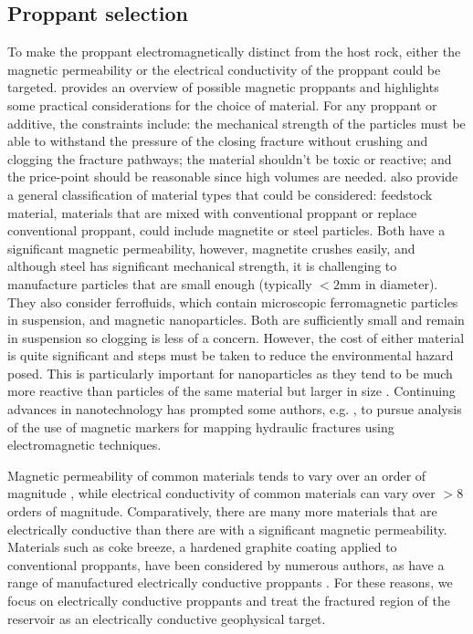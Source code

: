 \subsection{Proppant selection}
To make the proppant electromagnetically distinct from the host rock, either the magnetic permeability or the electrical conductivity of the proppant could be targeted. \cite{Zawadzki2016} provides an overview of possible magnetic proppants and highlights some practical considerations for the choice of material. For any proppant or additive, the constraints include: the mechanical strength of the particles must be able to withstand the pressure of the closing fracture without crushing and clogging the fracture pathways; the material shouldn’t be toxic or reactive; and the price-point should be reasonable since high volumes are needed. \cite{Zawadzki2016} also provide a general classification of material types that could be considered: feedstock material, materials that are mixed with conventional proppant or replace conventional proppant, could include magnetite or steel particles. Both have a significant magnetic permeability, however, magnetite crushes easily, and although steel has significant mechanical strength, it is challenging to manufacture particles that are small enough (typically $< 2$mm in diameter). They also consider ferrofluids, which contain microscopic ferromagnetic particles in suspension, and magnetic nanoparticles. Both are sufficiently small and remain in suspension so clogging is less of a concern. However, the cost of either material is quite significant and steps must be taken to reduce the environmental hazard posed. This is particularly important for nanoparticles as they tend to be much more reactive than particles of the same material but larger in size \citep{Zawadzki2016}. Continuing advances in nanotechnology has prompted some authors, e.g. \citep{Rahmani2014}, to pursue analysis of the use of magnetic markers for mapping hydraulic fractures using electromagnetic techniques.

Magnetic permeability of common materials tends to vary over an order of magnitude \cite{Telford1990}, while electrical conductivity of common materials can vary over $> 8$ orders of magnitude. Comparatively, there are many more materials that are electrically conductive than there are with a significant magnetic permeability. Materials such as coke breeze, a hardened graphite coating applied to conventional proppants, have been considered by numerous authors, as have a range of manufactured electrically conductive proppants \citep{Pardo2013, Hoversten2015, Weiss2015, Labrecque2016, Hu2018}. For these reasons, we focus on electrically conductive proppants and treat the fractured region of the reservoir as an electrically conductive geophysical target.

